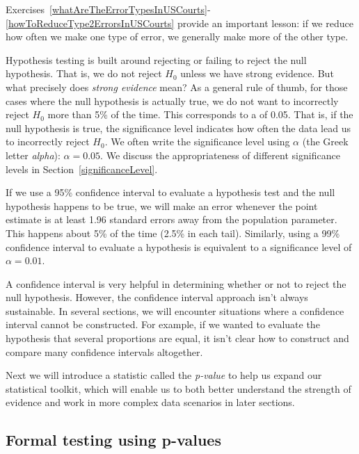 Exercises~\ref{whatAreTheErrorTypesInUSCourts}-\ref{howToReduceType2ErrorsInUSCourts} provide
an important lesson: if we reduce how often we make
 one type of error, we generally make more of the
 other type.

Hypothesis testing is built around rejecting or failing
to reject the null hypothesis.
That is, we do not reject $H_0$ unless we have strong evidence.
But what precisely does \emph{strong evidence} mean?
As a general rule of thumb, for those cases where the null
hypothesis is actually true, we do not want to incorrectly
reject $H_0$ more than 5\% of the time.
This corresponds to a %
 of 0.05.
That is, if the null hypothesis is true,
the significance level indicates how often
the data lead us to incorrectly reject $H_0$.
We often write the significance level using $\alpha$
(the Greek letter \emph{alpha}):
$\alpha = 0.05$.
We discuss the appropriateness of different significance
levels in Section~\ref{significanceLevel}.

\D{\newpage}

If we use a 95\% confidence interval to evaluate a
hypothesis test and the null hypothesis happens to be true,
we will make an error whenever the point estimate is
at least 1.96 standard errors away from the population
parameter.
This happens about 5\% of the time (2.5\% in each tail).
Similarly, using a 99\% confidence interval to evaluate
a hypothesis is equivalent to a significance level of
$\alpha = 0.01$.

A confidence interval is very helpful in determining
whether or not to reject the null hypothesis.
However, the confidence interval approach isn't always
sustainable.
In several sections, we will encounter situations where
a confidence interval cannot be constructed.
For example, if we wanted to evaluate the hypothesis
that several proportions are equal, it isn't clear how
to construct and compare many confidence intervals
altogether.

Next we will introduce a statistic called the \emph{p-value}
to help us expand our statistical toolkit, which will
enable us to both better understand the strength of
evidence and work in more complex data scenarios in
later sections.



\subsection{Formal testing using p-values}

